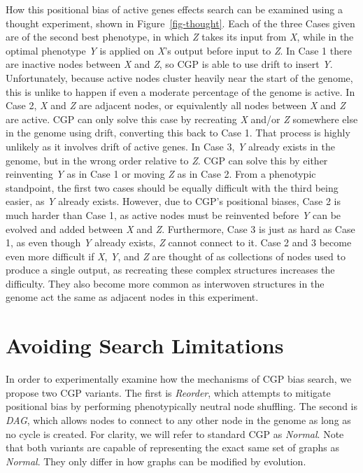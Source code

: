 \documentclass{sig-alternate}
\begin{document}
How this positional bias of active genes effects search can be examined
using a thought experiment, shown in Figure~\ref{fig-thought}.  
Each of the three Cases given are of the second best phenotype, in which \emph{Z}
takes its input from \emph{X}, while in the optimal phenotype \emph{Y} is applied
on \emph{X}'s output before input to \emph{Z}.  In Case 1 there are inactive nodes
between \emph{X} and \emph{Z}, so CGP is able to use drift to insert \emph{Y}.
Unfortunately, because active nodes cluster heavily near the start of the genome,
this is unlike to happen if even a moderate percentage of the genome is active.
In Case 2, \emph{X} and \emph{Z} are adjacent nodes, or equivalently all nodes between
\emph{X} and \emph{Z} are active.  CGP can only solve this case by recreating \emph{X}
and/or \emph{Z} somewhere else in the genome using drift, converting this back
to Case 1.  That process is highly unlikely as it involves drift of active genes.
In Case 3, \emph{Y} already exists in the genome, but in the wrong order relative to \emph{Z}.
CGP can solve this by either reinventing \emph{Y} as in Case 1 or moving \emph{Z} as in Case 2.
From a phenotypic standpoint, the first two cases should be equally difficult with the third
being easier, as \emph{Y} already exists.  However, due to CGP's positional biases, Case 2 is much harder than Case 1,
as active nodes must be reinvented before \emph{Y} can be evolved and added between \emph{X} and \emph{Z}.
Furthermore, Case 3 is just as hard as Case 1, as even though \emph{Y} already exists, \emph{Z} cannot connect to it.
Case 2 and 3 become even more difficult if \emph{X}, \emph{Y}, and \emph{Z} are thought of as
collections of nodes used to produce a single output, as recreating these complex structures
increases the difficulty.  They also become more common as interwoven structures in the
genome act the same as adjacent nodes in this experiment.

\section{Avoiding Search Limitations}
\label{sec-modifying-cgp}
In order to experimentally examine how the mechanisms of CGP bias search, we propose two CGP variants.
The first
is \emph{Reorder}, which attempts to mitigate positional bias by performing phenotypically
neutral node shuffling.  The second is \emph{DAG}, which allows nodes to connect
to any other node in the genome as long as no cycle is created.  For clarity, we will
refer to standard CGP as \emph{Normal}.  Note that both variants are capable of
representing the exact same set of graphs as \emph{Normal}.  They only differ
in how graphs can be modified by evolution.
\end{document}
